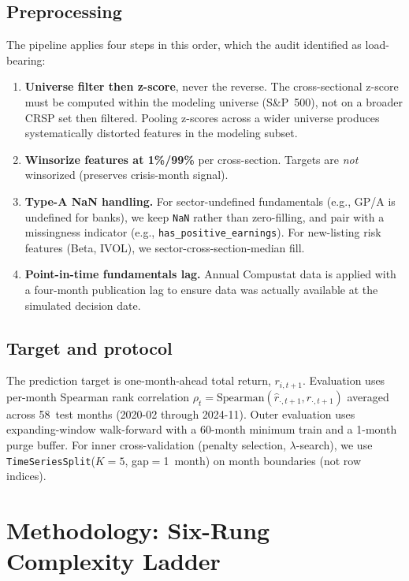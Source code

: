 \documentclass[11pt]{article}
\begin{document}
\subsection{Preprocessing}

The pipeline applies four steps in this order, which the audit identified
as load-bearing:

\begin{enumerate}[leftmargin=2em,topsep=2pt,itemsep=2pt]
\item \textbf{Universe filter then z-score}, never the reverse. The
  cross-sectional z-score must be computed within the modeling universe
  (S\&P~500), not on a broader CRSP set then filtered. Pooling z-scores
  across a wider universe produces systematically distorted features
  in the modeling subset.
\item \textbf{Winsorize features at 1\%/99\%} per cross-section. Targets
  are \emph{not} winsorized (preserves crisis-month signal).
\item \textbf{Type-A NaN handling.} For sector-undefined fundamentals
  (e.g., GP/A is undefined for banks), we keep \texttt{NaN} rather than
  zero-filling, and pair with a missingness indicator (e.g.,
  \texttt{has\_positive\_earnings}). For new-listing risk features
  (Beta, IVOL), we sector-cross-section-median fill.
\item \textbf{Point-in-time fundamentals lag.} Annual Compustat data is
  applied with a four-month publication lag to ensure data was actually
  available at the simulated decision date.
\end{enumerate}

\subsection{Target and protocol}

The prediction target is one-month-ahead total return,
$r_{i,t+1}$. Evaluation uses per-month Spearman rank correlation
$\rho_t = \text{Spearman}(\hat{r}_{\cdot,t+1}, r_{\cdot,t+1})$ averaged
across 58~test months (2020-02 through 2024-11). Outer evaluation uses
expanding-window walk-forward with a 60-month minimum train and a
1-month purge buffer. For inner cross-validation (penalty selection,
$\lambda$-search), we use \texttt{TimeSeriesSplit}($K{=}5$,
gap$=$1~month) on month boundaries (not row indices).

\section{Methodology: Six-Rung Complexity Ladder}\label{sec:methodology}
\end{document}
